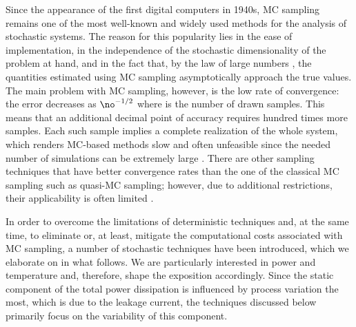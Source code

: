 Since the appearance of the first digital computers in 1940s, \acf{MC} sampling
remains one of the most well-known and widely used methods for the analysis of
stochastic systems. The reason for this popularity lies in the ease of
implementation, in the independence of the stochastic dimensionality of the
problem at hand, and in the fact that, by the law of large numbers
\cite{durrett2010}, the quantities estimated using \ac{MC} sampling
asymptotically approach the true values. The main problem with \ac{MC} sampling,
however, is the low rate of convergence: the error decreases as $\no^{-1/2}$
where \no is the number of drawn samples. This means that an additional decimal
point of accuracy requires hundred times more samples. Each such sample implies
a complete realization of the whole system, which renders \ac{MC}-based methods
slow and often unfeasible since the needed number of simulations can be
extremely large \cite{diaz-emparanza2002}. There are other sampling techniques
that have better convergence rates than the one of the classical \ac{MC}
sampling such as quasi-\ac{MC} sampling; however, due to additional
restrictions, their applicability is often limited \cite{xiu2010}.

In order to overcome the limitations of deterministic techniques and, at the
same time, to eliminate or, at least, mitigate the computational costs
associated with \ac{MC} sampling, a number of stochastic techniques have been
introduced, which we elaborate on in what follows. We are particularly
interested in power and temperature and, therefore, shape the exposition
accordingly. Since the static component of the total power dissipation is
influenced by process variation the most, which is due to the leakage current,
the techniques discussed below primarily focus on the variability of this
component.

